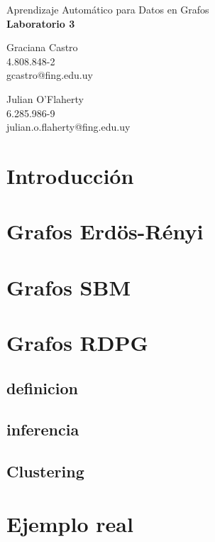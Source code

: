 \documentclass{article}
\begin{document}
\begin{center}
    {\Large Aprendizaje Automático para Datos en Grafos} \\
    {\LARGE \textbf{Laboratorio 3}} \\
    \vspace{2em}
    \begin{minipage}{0.45\textwidth}
        \centering
        Graciana Castro \\
        4.808.848-2 \\
        gcastro@fing.edu.uy
    \end{minipage}
    \hfill
    \begin{minipage}{0.45\textwidth}
        \centering
        Julian O'Flaherty \\
        6.285.986-9 \\
        julian.o.flaherty@fing.edu.uy
    \end{minipage}
\end{center}


\section{Introducción}

\section{Grafos Erdös-Rényi}

\section{Grafos SBM}

\section{Grafos RDPG}

\subsection{definicion}

\subsection{inferencia}

\subsection{Clustering }

\section{Ejemplo real}
\end{document}

